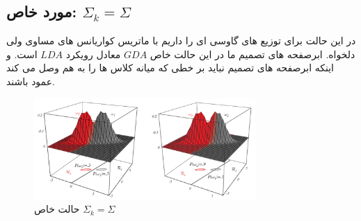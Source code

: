 \documentclass[12pt]{article}
\begin{document}
\subsection*{مورد خاص: $\Sigma_{k}=\Sigma$ }

در این حالت برای توزیع های گاوسی ای را داریم با ماتریس کواریانس های مساوی ولی دلخواه. ابرصفحه های تصمیم ما در این حالت خاص $GDA$ معادل رویکرد $LDA$ است.
و اینکه ابرصفحه های تصمیم نباید بر خطی که میانه کلاس ها را به هم وصل می کند عمود باشند.
\begin{figure}[h]
  \centering
  \includegraphics[width=0.75\textwidth]{figs/5.png}
  \caption{حالت خاص $\Sigma_{k}=\Sigma$}
  \label{5}
\end{figure}
\end{document}
